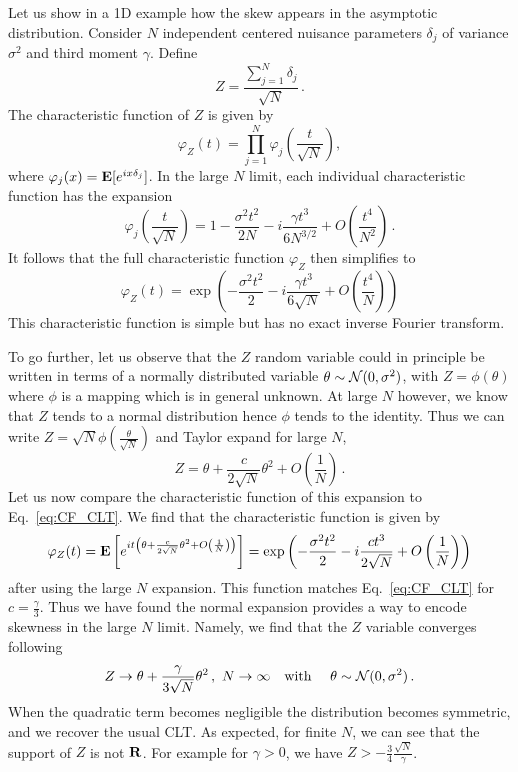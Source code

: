 \documentclass[11pt]{article}
\newcommand{\be}{\begin{equation}}
\newcommand{\ee}{\end{equation}}
\begin{document}
Let us show in a 1D example how the skew appears  in the asymptotic distribution. Consider $N$ independent centered nuisance parameters $\delta_j$ of variance $\sigma^2$ and third moment $\gamma$. Define \be Z=\frac{\sum_{j=1}^N \delta_j}{\sqrt{N}}\,.
\ee
The characteristic function of $Z$ is given by
\be
\varphi_Z(t)=\prod_{j=1}^N\varphi_{j}\left(\frac{t}{\sqrt{N}}\right),
\ee
where $\varphi_{j}(x) = {\bf E}[e^{ix\delta_{j}}]$.
 In the large $N$ limit, each individual characteristic function has the expansion
\be
\varphi_{j}\left(\frac{t}{\sqrt{N}}\right)= 1-\frac{\sigma^2 t^2}{2N}-i \frac{\gamma t^3}{6 N^{3/2}} +O\left(\frac{t^4}{N^2}\right)\,.
\ee
It follows that the full characteristic function $\varphi_Z$ then simplifies to
\be
\varphi_Z(t)=\exp\left(-\frac{\sigma^2 t^2}{2}-i \frac{\gamma t^3}{6 \sqrt{N}} +O\left(\frac{t^4}{N}\right)\right) \label{eq:CF_CLT}
 \ee
 This characteristic function is simple but has no exact inverse Fourier transform.


To go further, let us observe that the $Z$ random variable could in principle be written in terms of a normally distributed variable $\theta\sim {\cal N}(0,\sigma^2)$,
 with $Z=\phi(\theta)$ where $\phi$ is a mapping which is in general unknown.  At large $N$ however, we know that $Z$ tends to a normal distribution hence $\phi$ tends to the identity. Thus we can write $Z=\sqrt{N}\phi\left(\frac{\theta}{\sqrt{N}}\right)$ and Taylor expand for large $N$,
\be
Z=\theta+\frac{c}{2\sqrt{N}}\theta^2+O\left(\frac{1}{N}\right)\,.
\ee
Let us now compare the characteristic function of  this expansion to Eq.~\eqref{eq:CF_CLT}.
We find that the characteristic function is given by
\be
\varphi_Z(t)={\bf E} \left[ e^{it \left(\theta+\frac{c}{2\sqrt{N}}\theta^2+O\left(\frac{1}{N}\right)\right)} \right]
=\exp\left(-\frac{\sigma^2 t^2}{2}-i \frac{c t^3}{ 2 \sqrt{N}} +O\left(\frac{1}{N}\right)\right)
\label{eq:CF_exp}
\ee
after using the large $N$ expansion. This function matches Eq.~\eqref{eq:CF_CLT} for $c=\frac{\gamma}{3}$. Thus we have found the normal expansion provides a way to encode skewness in the large $N$ limit. Namely, we find that the $Z$ variable converges following
\be
Z\rightarrow \theta+\frac{\gamma}{3\sqrt{N}}\theta^2\,,\,\,N\rightarrow \infty  \quad \textrm{with } \quad \theta\sim{\cal N}(0,\sigma^2)\,.
\ee
When the quadratic term becomes negligible the distribution becomes symmetric, and we recover the usual CLT.
As expected, for finite $N$, we can see that  the support of $Z$ is not $\bf R$. For example for $\gamma>0$, we have
$Z>-\frac{3}{4}\frac{\sqrt{N}}{\gamma}$.
\end{document}
